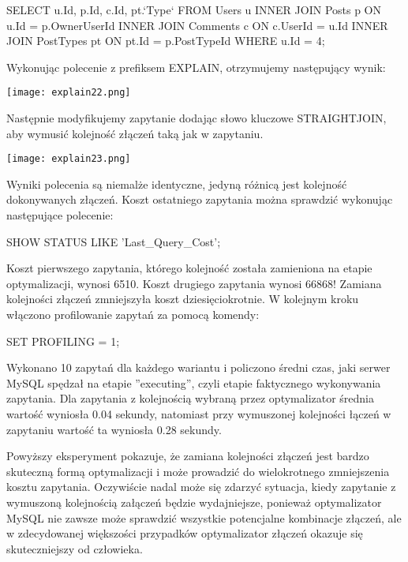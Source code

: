 \begin{spverbatim}
	SELECT u.Id, p.Id, c.Id, pt.`Type` FROM Users u INNER JOIN Posts p ON u.Id = p.OwnerUserId	INNER JOIN Comments c ON c.UserId = u.Id INNER JOIN PostTypes pt ON pt.Id = p.PostTypeId WHERE u.Id = 4;
\end{spverbatim}

Wykonując polecenie z prefiksem EXPLAIN, otrzymujemy następujący wynik:
\begin{center}
	\texttt{[image: explain22.png]} 
\end{center}
Następnie modyfikujemy zapytanie dodając słowo kluczowe STRAIGHT\textunderscore JOIN, aby wymusić kolejność złączeń taką jak w zapytaniu.
\begin{center}
	\texttt{[image: explain23.png]} 
\end{center}
Wyniki polecenia są niemalże identyczne, jedyną różnicą jest kolejność dokonywanych złączeń. Koszt ostatniego zapytania można sprawdzić wykonując następujące polecenie:
\begin{spverbatim}
	SHOW STATUS LIKE 'Last_Query_Cost';
\end{spverbatim}
Koszt pierwszego zapytania, którego kolejność została zamieniona na etapie optymalizacji, wynosi 6510. Koszt drugiego zapytania wynosi 66868! Zamiana kolejności złączeń zmniejszyła koszt dziesięciokrotnie.
W kolejnym kroku włączono profilowanie zapytań za pomocą komendy:
\begin{spverbatim}
	SET PROFILING = 1;
\end{spverbatim}
Wykonano 10 zapytań dla każdego wariantu i policzono średni czas, jaki serwer MySQL spędzał na etapie ''executing'', czyli etapie faktycznego wykonywania zapytania. Dla zapytania z kolejnością wybraną przez optymalizator średnia wartość wyniosła 0.04 sekundy, natomiast przy wymuszonej kolejności łączeń w zapytaniu wartość ta wyniosła 0.28 sekundy. 

Powyższy eksperyment pokazuje, że zamiana kolejności złączeń jest bardzo skuteczną formą optymalizacji i może prowadzić do wielokrotnego zmniejszenia kosztu zapytania. Oczywiście nadal może się zdarzyć sytuacja, kiedy zapytanie z wymuszoną kolejnością załączeń będzie wydajniejsze, ponieważ optymalizator MySQL nie zawsze może sprawdzić wszystkie potencjalne kombinacje złączeń, ale w zdecydowanej większości przypadków optymalizator złączeń okazuje się skuteczniejszy od człowieka.

